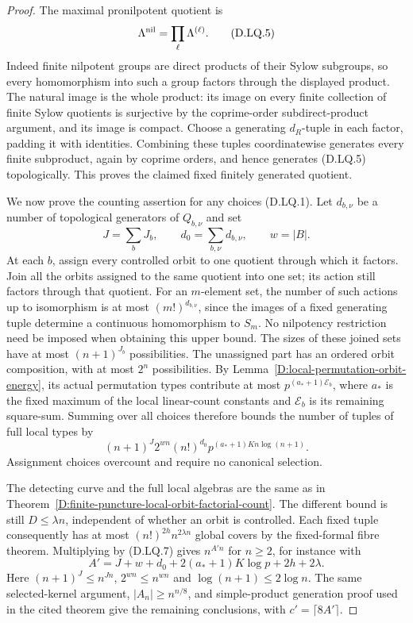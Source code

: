 \begin{proof}
The maximal pronilpotent quotient is
\[
                        \Lambda^{\rm nil}
                            =\prod_{\ell}\Lambda^{(\ell)}.
                                                               \tag{D.LQ.5}
\]
Indeed finite nilpotent groups are direct products of their Sylow
subgroups, so every homomorphism into such a group factors through
the displayed product. The natural image is the whole product:
its image on every finite collection of finite Sylow quotients is
surjective by the coprime-order subdirect-product argument, and
its image is compact. Choose a generating $d_R$-tuple in each
factor, padding it with identities. Combining these tuples
coordinatewise generates every finite subproduct, again by
coprime orders, and hence generates (D.LQ.5) topologically.
This proves the claimed fixed finitely generated quotient.

We now prove the counting assertion for any choices (D.LQ.1).
Let $d_{b,\nu}$ be a number of topological generators of
$Q_{b,\nu}$ and set
\[
             J=\sum_bJ_b,\qquad
             d_0=\sum_{b,\nu}d_{b,\nu},\qquad w=|B|.
                                                               \tag{D.LQ.6}
\]
At each $b$, assign every controlled orbit to one quotient through
which it factors. Join all the orbits assigned to the same quotient
into one set; its action still factors through that quotient.
For an $m$-element set, the number of such actions up to isomorphism
is at most $(m!)^{d_{b,\nu}}$, since the images of a fixed generating
tuple determine a continuous homomorphism to $S_m$.
No nilpotency restriction need be imposed when obtaining this
upper bound. The sizes of these joined sets have at most
$(n+1)^{J_b}$ possibilities. The unassigned part has an ordered
orbit composition, with at most $2^n$ possibilities.
By Lemma~\ref{D:local-permutation-orbit-energy}, its actual
permutation types contribute at most
$p^{(a_*+1)\mathcal E_b}$, where $a_*$ is the fixed maximum of
the local linear-count constants and $\mathcal E_b$ is its
remaining square-sum. Summing over all choices therefore bounds
the number of tuples of full local types by
\[
          (n+1)^J2^{wn}(n!)^{d_0}
                 p^{(a_*+1)K n\log(n+1)}.                \tag{D.LQ.7}
\]
Assignment choices overcount and require no canonical selection.

The detecting curve and the full local algebras are the same as
in Theorem~\ref{D:finite-puncture-local-orbit-factorial-count}.
The different bound is still $D\le\lambda n$, independent of
whether an orbit is controlled. Each fixed tuple consequently
has at most $(n!)^{2h}n^{2\lambda n}$ global covers by the
fixed-formal fibre theorem. Multiplying by (D.LQ.7) gives
$n^{A'n}$ for $n\ge2$, for instance with
\[
 A'=J+w+d_0+2(a_*+1)K\log p+2h+2\lambda.                \tag{D.LQ.8}
\]
Here $(n+1)^J\le n^{Jn}$, $2^{wn}\le n^{wn}$ and
$\log(n+1)\le2\log n$. The same selected-kernel argument,
$|A_n|\ge n^{n/8}$, and simple-product generation proof used in
the cited theorem give the remaining conclusions, with
$c'=\lceil8A'\rceil$.


\end{proof}
